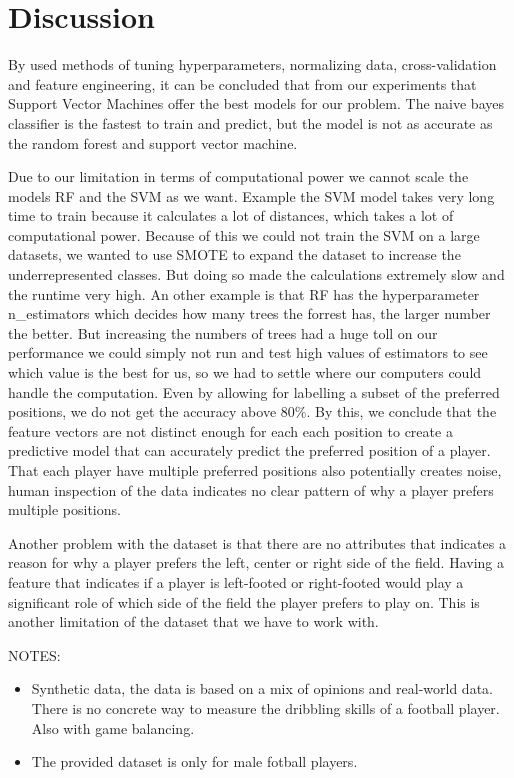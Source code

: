 \section{Discussion}

By used methods of tuning hyperparameters, normalizing data, cross-validation and feature engineering, it can be concluded that from our experiments that Support Vector Machines offer the best models for our problem. The naive bayes classifier is the fastest to train and predict, but the model is not as accurate as the random forest and support vector machine. 
\par
Due to our limitation in terms of computational power we cannot scale the models RF and the SVM as we want. 
Example the SVM model takes very long time to train because it calculates a lot of distances, which takes a lot of computational power. 
Because of this we could not train the SVM on a large datasets, we wanted to use SMOTE to expand the dataset to increase the underrepresented classes.
But doing so made the calculations extremely slow and the runtime very high. An other example is that RF has the hyperparameter n\_estimators which decides how many trees the forrest has, the larger number the better. 
But increasing the numbers of trees had a huge toll on our performance we could simply not run and test high values of estimators to see which value is the best for us, so we had to settle where our computers could handle the computation.
Even by allowing for labelling a subset of the preferred positions, we do not get the accuracy above $80\%$. By this, we conclude that the feature vectors are not distinct enough for each each position to create a predictive model that can accurately predict the preferred position of a player. That each player have multiple preferred positions also potentially creates noise, human inspection of the data indicates no clear pattern of why a player prefers multiple positions.
\par
Another problem with the dataset is that there are no attributes that indicates a reason for why a player prefers the left, center or right side of the field. Having a feature that indicates if a player is left-footed or right-footed would play a significant role of which side of the field the player prefers to play on. This is another limitation of the dataset that we have to work with. 

NOTES:
\begin{itemize}
    \item Synthetic data, the data is based on a mix of opinions and real-world data. There is no concrete way to measure the dribbling skills of a football player. Also with game balancing.
    \item The provided dataset is only for male fotball players.
\end{itemize}


